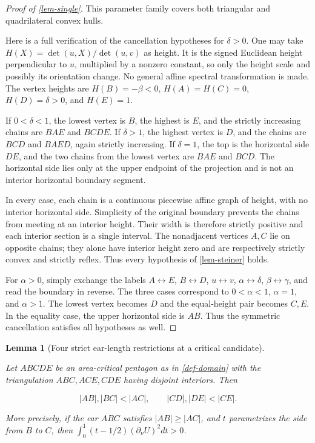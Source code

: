 \documentclass[11pt,a4paper]{article}
\theoremstyle{proofmanuscript}
\newtheorem{lemma}[theorem]{Lemma}
\begin{document}
\begin{proof}[Proof of \ref{lem-single}]
This parameter family covers both triangular and quadrilateral convex hulls.

Here is a full verification of the cancellation hypotheses for \(\delta>0\). One may take \(H(X)=\det(u,X)/\det(u,v)\) as height. It is the signed Euclidean height perpendicular to \(u\), multiplied by a nonzero constant, so only the height scale and possibly its orientation change. No general affine spectral transformation is made. The vertex heights are \(H(B)=-\beta<0\), \(H(A)=H(C)=0\), \(H(D)=\delta>0\), and \(H(E)=1\).

If \(0<\delta<1\), the lowest vertex is \(B\), the highest is \(E\), and the strictly increasing chains are \(BAE\) and \(BCDE\). If \(\delta>1\), the highest vertex is \(D\), and the chains are \(BC D\) and \(BAED\), again strictly increasing. If \(\delta=1\), the top is the horizontal side \(DE\), and the two chains from the lowest vertex are \(BAE\) and \(BCD\). The horizontal side lies only at the upper endpoint of the projection and is not an interior horizontal boundary segment.

In every case, each chain is a continuous piecewise affine graph of height, with no interior horizontal side. Simplicity of the original boundary prevents the chains from meeting at an interior height. Their width is therefore strictly positive and each interior section is a single interval. The nonadjacent vertices \(A,C\) lie on opposite chains; they alone have interior height zero and are respectively strictly convex and strictly reflex. Thus every hypothesis of \ref{lem-steiner} holds.

For \(\alpha>0\), simply exchange the labels \(A\leftrightarrow E\), \(B\leftrightarrow D\), \(u\leftrightarrow v\), \(\alpha\leftrightarrow\delta\), \(\beta\leftrightarrow\gamma\), and read the boundary in reverse. The three cases correspond to \(0<\alpha<1\), \(\alpha=1\), and \(\alpha>1\). The lowest vertex becomes \(D\) and the equal-height pair becomes \(C,E\). In the equality case, the upper horizontal side is \(AB\). Thus the symmetric cancellation satisfies all hypotheses as well.

\end{proof}

\begin{lemma}[Four strict ear-length restrictions at a critical candidate]\label{lem-ear}

Let \(ABCDE\) be an area-critical pentagon as in \ref{def-domain} with the triangulation \(ABC,ACE,CDE\) having disjoint interiors. Then

\[
|AB|,|BC|<|AC|,\qquad |CD|,|DE|<|CE|.
\]

More precisely, if the ear \(ABC\) satisfies \(|AB|\ge|AC|\), and \(t\) parametrizes the side from \(B\) to \(C\), then \(\int_0^1(t-1/2)(\partial_\nu U)^2dt>0\).

\end{lemma}
\end{document}

